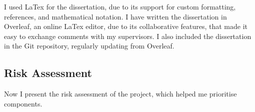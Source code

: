 I used LaTex for the dissertation, due to its support for custom formatting, references, and mathematical notation. I have written the dissertation in Overleaf, an online LaTex editor, due to its collaborative features, that made it easy to exchange comments with my supervisors. I also included the dissertation in the Git repository, regularly updating from Overleaf.



\subsection{Risk Assessment}

Now I present the risk assessment of the project, which helped me prioritise components.

